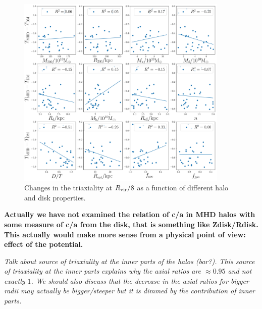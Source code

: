 \documentclass[a4paper,fleqn,usenatbib]{mnras}
\begin{document}
\begin{figure}
\centering
\includegraphics[width=0.9\textwidth]{delta_T_correlations.pdf}
\caption{Changes in the triaxiality at $R_{\rm vir}/8$ as a function of different halo and disk properties.}
\label{fig:sphericity}
\end{figure}    

\textbf{Actually we have not examined the relation of c/a in MHD halos
  with some measure of c/a from the disk, that is something like
  Zdisk/Rdisk. This actually would make more sense from a physical
  point of view: effect of the potential. } 


\textit{ Talk about source of triaxiality at the inner parts of the
  halos (bar?). This source of triaxiality at the inner parts explains
  why the axial ratios are $\approx 0.95$ and not exactly $1$. We
  should also discuss that the decrease in the axial ratios for bigger
  radii may actually be bigger/steeper but it is dimmed by the
  contribution of inner parts.} 


\end{document}
